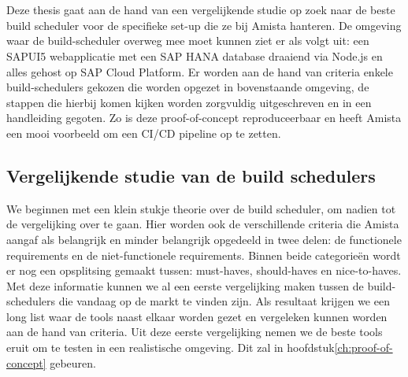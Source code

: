 
\chapter{}
\label{ch:methodologie}

Deze thesis gaat aan de hand van een vergelijkende studie op zoek naar de beste build scheduler voor de specifieke set-up die ze bij Amista hanteren. De omgeving waar de build-scheduler overweg mee moet kunnen ziet er als volgt uit: een SAPUI5 webapplicatie met een SAP HANA database draaiend via Node.js en alles gehost op SAP Cloud Platform. Er worden aan de hand van criteria enkele build-schedulers gekozen die worden opgezet in bovenstaande omgeving, de stappen die hierbij komen kijken worden zorgvuldig uitgeschreven en in een handleiding gegoten. Zo is deze proof-of-concept reproduceerbaar en heeft Amista een mooi voorbeeld om een CI/CD pipeline op te zetten.

    \section{Vergelijkende studie van de build schedulers}
    \label{sec:Vergelijkende-studie-build-schedulers}
    We beginnen met een klein stukje theorie over de build scheduler, om nadien tot de vergelijking over te gaan. Hier worden ook de verschillende criteria die Amista aangaf als belangrijk en minder belangrijk opgedeeld in twee delen: de functionele requirements en de niet-functionele requirements. Binnen beide categorieën wordt er nog een opsplitsing gemaakt tussen: must-haves, should-haves en nice-to-haves.
    Met deze informatie kunnen we al een eerste vergelijking maken tussen de build-schedulers die vandaag op de markt te vinden zijn. Als resultaat krijgen we een long list waar de tools naast elkaar worden gezet en vergeleken kunnen worden aan de hand van criteria. 
    Uit deze eerste vergelijking nemen we de beste tools eruit om te testen in een realistische omgeving. Dit zal in hoofdstuk\ref{ch:proof-of-concept} gebeuren.

